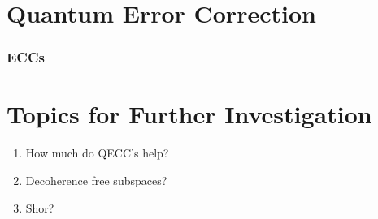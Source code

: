 \section{Quantum Error Correction}

\subsubsection{ECCs}

\section{Topics for Further Investigation}

\begin{enumerate}
\item How much do QECC's help?
\item Decoherence free subspaces?
\item Shor?
\end{enumerate}
